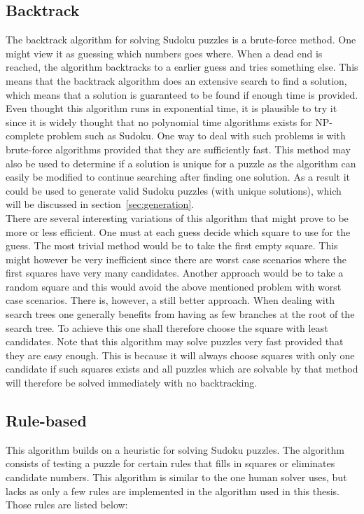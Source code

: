 \documentclass[a4paper,11pt]{kth-mag}
\begin{document}
\subsection{Backtrack}
The backtrack algorithm for solving Sudoku puzzles is a brute-force method.
One might view it as guessing which numbers goes where.
When a dead end is reached, the algorithm backtracks to a earlier guess and tries something else.
This means that the backtrack algorithm does an extensive search to find a solution, which means that a solution is guaranteed to be found if enough time is provided.
Even thought this algorithm runs in exponential time, it is plausible to try it since it is widely thought that no polynomial time algorithms exists for NP-complete problem such as Sudoku. 
One way to deal with such problems is with brute-force algorithms provided that they are sufficiently fast.
This method may also be used to determine if a solution is unique for a puzzle as the algorithm can easily be modified to continue searching after finding one solution.
As a result it could be used to generate valid Sudoku puzzles (with unique solutions), which will be discussed in section~\ref{sec:generation}.\\
There are several interesting variations of this algorithm that might prove to be more or less efficient.
One must at each guess decide which square to use for the guess.
The most trivial method would be to take the first empty square.
This might however be very inefficient since there are worst case scenarios where the first squares have very many candidates.
Another approach would be to take a random square and this would avoid the above mentioned problem with worst case scenarios.
There is, however, a still better approach.
When dealing with search trees one generally benefits from having as few branches at the root of the search tree.
To achieve this one shall therefore choose the square with least candidates.
Note that this algorithm may solve puzzles very fast provided that they are easy enough.
This is because it will always choose squares with only one candidate if such squares exists and all puzzles which are solvable by that method will therefore be solved immediately with no backtracking.

\FloatBarrier
\subsection{Rule-based}
\label{sec:rulebasedBackground}
This algorithm builds on a heuristic for solving Sudoku puzzles.
The algorithm consists of testing a puzzle for certain rules that fills in squares or eliminates candidate numbers.
This algorithm is similar to the one human solver uses, but lacks as only a few rules are implemented in the algorithm used in this thesis. Those rules are listed below:
\end{document}
